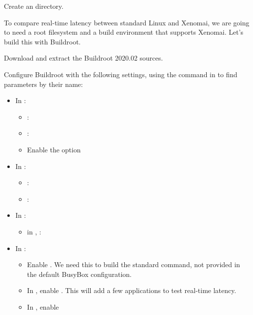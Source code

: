 Create an  directory.

To compare real-time latency between standard Linux and Xenomai, we
are going to need a root filesystem and a build environment that
supports Xenomai. Let's build this with Buildroot.

Download and extract the Buildroot 2020.02 sources.

Configure Buildroot with the following settings,
using the \code{/} command in  to find parameters by their name:

\begin{itemize}
\item In :
   \begin{itemize}
   \item {}: 
   \item {}: 
   \item Enable the  option
   \end{itemize}
\item In :
   \begin{itemize}
   \item {}: 
   \item {}: 
   \end{itemize}
\item In :
   \begin{itemize}
   \item in ,  : 
   \end{itemize}
\item In :
   \begin{itemize}
   \item Enable .
         We need this to build the standard  command, not
         provided in the default BusyBox configuration.
   \item In , enable
         . This will add a few applications to test
         real-time latency.
   \item In , enable 
   \end{itemize}
\end{itemize}

